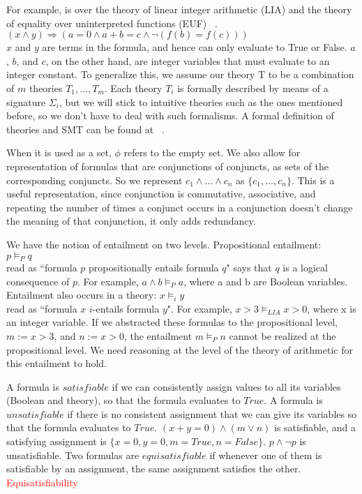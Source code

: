 \documentclass{report}
\begin{document}
For example, is over the theory of linear integer 
arithmetic (LIA) and the theory of 
equality over uninterpreted functions (EUF)
~\cite{LIAEUF}.\\
$(x \land y) \Rightarrow (a = 0 \land a + b = c \land 
\neg (f(b) = f(c)))$ \\
$x$ and $y$ are terms in the 
formula, and hence can only evaluate to True or False.
$a$, $b$, and $c$, on the other hand, are integer variables 
that must evaluate to an integer constant. To generalize 
this, we assume our theory T to be a combination of $m$ 
theories $T_1, ..., T_m$. Each theory $T_i$ is formally 
described by means of a signature $\Sigma_i$, but we 
will stick to intuitive theories such as the ones mentioned 
before, so we don't have to deal with such formalisms. A 
formal definition of theories and SMT can be found at 
~\cite{DBLP:reference/mc/BarrettT18}.

When it is used as a set, $\phi$ refers to the empty set. We also allow for representation of formulas that are 
conjunctions of conjuncts, as sets of the corresponding 
conjuncts. So we represent $c_1 \land ... \land c_n$ as
$\{c_1, ..., c_n\}$. This is a useful representation, 
since conjunction is commutative, associative, and 
repeating the number of times a conjunct occurs in a 
conjunction doesn't change the meaning of that conjunction, 
it only adds redundancy.

We have the notion of entailment on two levels. Propositional 
entailment: \\
$p \models_P q$ \\
read as ``formula $p$ propositionally entails formula $q$" says 
that $q$ is a logical consequence of $p$. For example, 
$a \land b \models_P a$, where a and b are Boolean 
variables. Entailment also occurs in a theory:
$x \models_i y$ \\
read as ``formula $x$ $i$-entails formula $y$". For example, 
$x > 3 \models_{LIA} x > 0$, where x is an integer variable.
If we abstracted these formulas to the propositional level, 
$m := x > 3$, and $n := x > 0$, 
the entailment $m \models_P n$ cannot be realized at the 
propositional level. We need reasoning at the level of 
the theory of arithmetic for this entailment to hold.

A formula is $satisfiable$ if we can consistently assign
values to all its variables (Boolean and theory), 
so that the formula evaluates to $True$. A formula is 
$unsatisfiable$ if there is no consistent assignment that 
we can give its variables so that the formula evaluates to 
$True$. $(x + y = 0) \land (m \lor n)$ is satisfiable, 
and a satisfying assignment is $\{x = 0, y = 0, m = True, 
n = False\}$. $p \land \neg p$ is unsatisfiable. Two formulas 
are $equisatisfiable$ if whenever one of them is satisfiable 
by an assignment, the same assignment satisfies the other. 
\textcolor{red}{Equisatisfiability}
\end{document}
